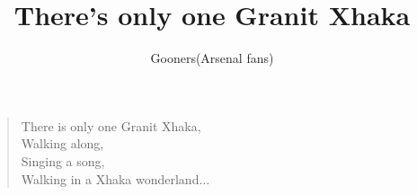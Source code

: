 \documentclass[a4paper,12pt]{article}
\title{There's only one Granit Xhaka}
\author{Gooners(Arsenal fans)}
\date{}
\begin{document}
	
	\maketitle
	
	\begin{verse}
		
		There is only one Granit Xhaka, \\
		Walking along, \\
		Singing a song, \\
		Walking in a Xhaka wonderland$\ldots$
		
	\end{verse}
	
\end{document}
